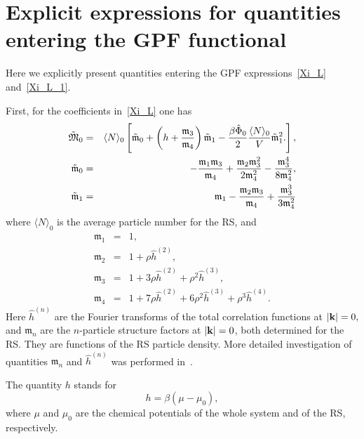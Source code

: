 \section{\label{sec:app-a} Explicit expressions for quantities entering the GPF functional}
Here we explicitly present quantities entering the GPF expressions~\eqref{Xi_L} and~\eqref{Xi_L_1}.

First, for the coefficients in~\eqref{Xi_L} one has
\begin{eqnarray*}
	\label{tilde_frak_M0}
	\tilde{\frak M}_0 & = & \langle N \rangle_0 
	\left[
		\tilde{\mathfrak{m}}_0
		+ \left(h + \frac{\mathfrak{m}_3}{\mathfrak{m}_4} \right) \tilde{\mathfrak{m}}_1
		- \frac{\beta \hat{\Phi}_0}{2}\frac{\langle N \rangle_0}{V} \tilde{\mathfrak{m}}_1^2.
	\right],
\\
	\tilde{\mathfrak{m}}_0 & = & -\frac{\mathfrak{m}_1 \mathfrak{m}_3}{\mathfrak{m}_4} + \frac{\mathfrak{m}_2 \mathfrak{m}^2_3}{2 \mathfrak{m}_4^2} - \frac{\mathfrak{m}_3^4}{8\mathfrak{m}_4^2},
\\
	\tilde{\mathfrak{m}}_1 & = & \mathfrak{m}_1 - \frac{\mathfrak{m}_2 \mathfrak{m}_3}{\mathfrak{m}_4} + \frac{\mathfrak{m}_3^3}{3\mathfrak{m}_4^2}
\end{eqnarray*}
where $\langle N \rangle_0$ is the average particle number for the RS, and
\begin{eqnarray*}
	\mathfrak{m}_1 & = & 1,
	\\
	\mathfrak{m}_2 & = & 1 + \rho \hat{h}^{(2)},
	\\
	\mathfrak{m}_3 & = & 1 + 3\rho \hat{h}^{(2)} + \rho^2 \hat{h}^{(3)},
	\\
	\mathfrak{m}_4 & = & 1 + 7\rho \hat{h}^{(2)} + 6\rho^2 \hat{h}^{(3)} + \rho^3 \hat{h}^{(4)}.
\end{eqnarray*}
Here $\hat{h}^{(n)}$ are the Fourier transforms of the total correlation functions at $\abs{\vb k} = 0,$ and $\mathfrak{m}_n$ are the $n$-particle structure factors at $\abs{\vb k} = 0$, both determined for the RS. They are functions of the RS particle density. More detailed investigation of quantities $\mathfrak{m}_n$ and $\hat{h}^{(n)}$ was performed in~\cite{RomaJPS2024,Roma2023Preprint}.

The quantity $h$ stands for
\begin{equation*}
	h = \beta(\mu - \mu_0),
\end{equation*}
where $\mu$ and $\mu_0$ are the chemical potentials of the whole system and of the RS, respectively.

